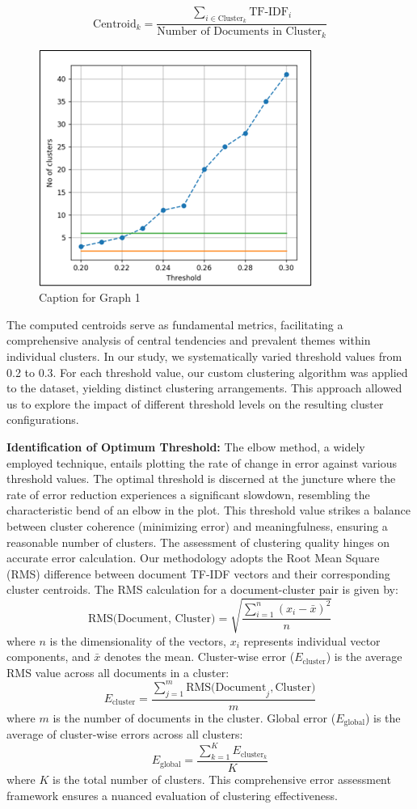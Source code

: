 \documentclass{article}
\begin{document}
\[ \text{Centroid}_k = \frac{\sum_{i \in \text{Cluster}_k} \text{TF-IDF}_i}{\text{Number of Documents in Cluster}_k} \]
\begin{figure}[ht]
    \centering
    \includegraphics[width=0.4\linewidth]{Graph1.png}
    \caption{Caption for Graph 1}
    \label{fig:graph1}
\end{figure}


The computed centroids serve as fundamental metrics, facilitating a comprehensive analysis of central tendencies and prevalent themes within individual clusters. In our study, we systematically varied threshold values from 0.2 to 0.3. For each threshold value, our custom clustering algorithm was applied to the dataset, yielding distinct clustering arrangements. This approach allowed us to explore the impact of different threshold levels on the resulting cluster configurations.

\textbf{Identification of Optimum Threshold: } The elbow method, a widely employed technique, entails plotting the rate of change in error against various threshold values. The optimal threshold is discerned at the juncture where the rate of error reduction experiences a significant slowdown, resembling the characteristic bend of an elbow in the plot. This threshold value strikes a balance between cluster coherence (minimizing error) and meaningfulness, ensuring a reasonable number of clusters.
The assessment of clustering quality hinges on accurate error calculation. Our methodology adopts the Root Mean Square (RMS) difference between document TF-IDF vectors and their corresponding cluster centroids.
The RMS calculation for a document-cluster pair is given by:
\[ \text{RMS(Document, Cluster)} = \sqrt{\frac{\sum_{i=1}^n (x_i - \bar{x})^2}{n}} \]
where \( n \) is the dimensionality of the vectors, \( x_i \) represents individual vector components, and \( \bar{x} \) denotes the mean.
Cluster-wise error (\( E_{\text{cluster}} \)) is the average RMS value across all documents in a cluster:
\[ E_{\text{cluster}} = \frac{\sum_{j=1}^m \text{RMS(Document}_j, \text{Cluster})}{m} \]
where \( m \) is the number of documents in the cluster.
Global error (\( E_{\text{global}} \)) is the average of cluster-wise errors across all clusters:
\[ E_{\text{global}} = \frac{\sum_{k=1}^K E_{\text{cluster}_k}}{K} \]
where \( K \) is the total number of clusters. This comprehensive error assessment framework ensures a nuanced evaluation of clustering effectiveness.
\end{document}
